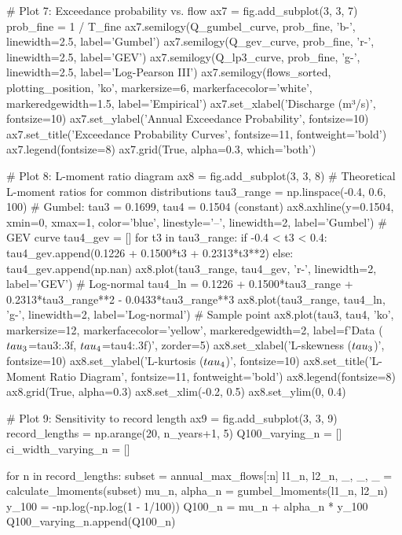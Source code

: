 \documentclass[a4paper, 11pt]{article}
\begin{document}
\begin{pycode}
# Plot 7: Exceedance probability vs. flow
ax7 = fig.add_subplot(3, 3, 7)
prob_fine = 1 / T_fine
ax7.semilogy(Q_gumbel_curve, prob_fine, 'b-', linewidth=2.5, label='Gumbel')
ax7.semilogy(Q_gev_curve, prob_fine, 'r-', linewidth=2.5, label='GEV')
ax7.semilogy(Q_lp3_curve, prob_fine, 'g-', linewidth=2.5, label='Log-Pearson III')
ax7.semilogy(flows_sorted, plotting_position, 'ko', markersize=6,
             markerfacecolor='white', markeredgewidth=1.5, label='Empirical')
ax7.set_xlabel('Discharge (m³/s)', fontsize=10)
ax7.set_ylabel('Annual Exceedance Probability', fontsize=10)
ax7.set_title('Exceedance Probability Curves', fontsize=11, fontweight='bold')
ax7.legend(fontsize=8)
ax7.grid(True, alpha=0.3, which='both')

# Plot 8: L-moment ratio diagram
ax8 = fig.add_subplot(3, 3, 8)
# Theoretical L-moment ratios for common distributions
tau3_range = np.linspace(-0.4, 0.6, 100)
# Gumbel: tau3 = 0.1699, tau4 = 0.1504 (constant)
ax8.axhline(y=0.1504, xmin=0, xmax=1, color='blue', linestyle='--', linewidth=2, label='Gumbel')
# GEV curve
tau4_gev = []
for t3 in tau3_range:
    if -0.4 < t3 < 0.4:
        tau4_gev.append(0.1226 + 0.1500*t3 + 0.2313*t3**2)
    else:
        tau4_gev.append(np.nan)
ax8.plot(tau3_range, tau4_gev, 'r-', linewidth=2, label='GEV')
# Log-normal
tau4_ln = 0.1226 + 0.1500*tau3_range + 0.2313*tau3_range**2 - 0.0433*tau3_range**3
ax8.plot(tau3_range, tau4_ln, 'g-', linewidth=2, label='Log-normal')
# Sample point
ax8.plot(tau3, tau4, 'ko', markersize=12, markerfacecolor='yellow',
         markeredgewidth=2, label=f'Data ($\\tau_3$={tau3:.3f}, $\\tau_4$={tau4:.3f})', zorder=5)
ax8.set_xlabel('L-skewness ($\\tau_3$)', fontsize=10)
ax8.set_ylabel('L-kurtosis ($\\tau_4$)', fontsize=10)
ax8.set_title('L-Moment Ratio Diagram', fontsize=11, fontweight='bold')
ax8.legend(fontsize=8)
ax8.grid(True, alpha=0.3)
ax8.set_xlim(-0.2, 0.5)
ax8.set_ylim(0, 0.4)

# Plot 9: Sensitivity to record length
ax9 = fig.add_subplot(3, 3, 9)
record_lengths = np.arange(20, n_years+1, 5)
Q100_varying_n = []
ci_width_varying_n = []

for n in record_lengths:
    subset = annual_max_flows[:n]
    l1_n, l2_n, _, _, _ = calculate_lmoments(subset)
    mu_n, alpha_n = gumbel_lmoments(l1_n, l2_n)
    y_100 = -np.log(-np.log(1 - 1/100))
    Q100_n = mu_n + alpha_n * y_100
    Q100_varying_n.append(Q100_n)


\end{pycode}
\end{document}
